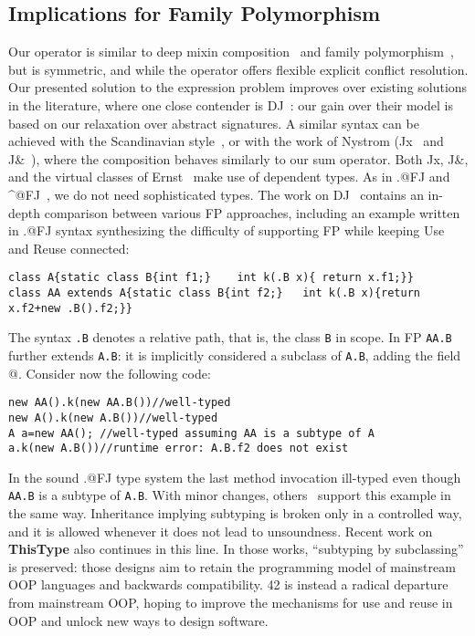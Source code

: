 \subsection{Implications for Family
Polymorphism}
\saveSpace
Our \Q@Use@ operator is similar to deep mixin composition~\cite{ernst99a,Zenger-Odersky2005, Hutchins06}
and family polymorphism~\cite{Ernst06, igarashi2005lightweight, IgarashiViroli07, IgarashiEtAl08}, but is symmetric, and while the operator
\Q@super@ offers flexible  explicit conflict resolution.
Our presented solution to the expression problem improves over existing solutions in the literature, where one close contender is DJ~\cite{deep}: our gain over their model is based on our relaxation over abstract signatures.
A similar syntax can be achieved with the Scandinavian style~\cite{ernst2004expression}, or with the work of 
Nystrom (Jx~\cite{NystromEtAl04} and
J\&~\cite{nystrom2006j}), where the composition behaves similarly to our sum operator.
Both Jx, J\&, and the virtual classes of Ernst~\cite{Ernst06}
make use of dependent types.
As in \Q@.@FJ and \Q@^@FJ~\cite{igarashi2005lightweight,IgarashiEtAl08,IgarashiViroli07,saito2008essence},
 we do not need sophisticated types. 
The work on DJ~\cite{deep} contains an in-depth comparison between various FP approaches, including an example written in \Q@.@FJ syntax synthesizing the difficulty of supporting FP while keeping Use and Reuse connected:
\saveSpace\saveSpace
\begin{lstlisting}
class A{static class B{int f1;}    int k(.B x){ return x.f1;}}
class AA extends A{static class B{int f2;}   int k(.B x){return x.f2+new .B().f2;}}
\end{lstlisting}\saveSpace\saveSpace
The syntax \lstinline{.B} denotes a relative path, that is, the 
class \lstinline{B} in scope.
In FP \lstinline{AA.B} further extends \lstinline{A.B}: it is implicitly considered a subclass of \lstinline{A.B}, adding the field @.
Consider now the following code:
\saveSpace\saveSpace\begin{lstlisting}
new AA().k(new AA.B())//well-typed
new A().k(new A.B())//well-typed
A a=new AA(); //well-typed assuming AA is a subtype of A
a.k(new A.B())//runtime error: A.B.f2 does not exist
\end{lstlisting}\saveSpace\saveSpace
In the sound \Q@.@FJ type system the last method invocation ill-typed even though \lstinline{AA.B} is a subtype of \lstinline{A.B}.
With minor changes, others~\cite{nystrom2006j,Ernst06,BruceEtAl98,IgarashiViroli07}
support this example in the same way.
Inheritance implying subtyping is broken only in a controlled way, and it is allowed whenever it does not lead to unsoundness.
Recent work on {\bf ThisType} \cite{Saito:2009,ryu16ThisType}
also continues in this line.
In those works, ``subtyping by subclassing'' is preserved: those designs aim to retain the programming model of mainstream OOP languages and backwards compatibility. 42 is instead a radical departure from mainstream OOP, hoping to improve the mechanisms for use and reuse in OOP and unlock new ways to design software.

